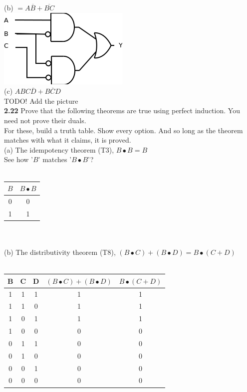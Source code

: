 \documentclass[12pt,a4paper]{report}
\newcommand*{\bl}{\overline{B}}
\newcommand*{\dl}{\overline{D}}
\begin{document}
\begin{normalsize}
(b) $ = A\bl{} + \overline{BC} $ \\
\includegraphics[scale=1]{2_16B} \\

(c) $ ABC\dl{} + \overline{BCD} $ \\
TODO! Add the picture \\

\textbf{2.22} Prove that the following theorems are true using perfect induction. You need not prove their duals.\\

For these, build a truth table. Show every option. And so long as the theorem matches with what it claims, it is proved. \\

(a) The idempotency theorem (T3), $ B \bullet B = B $ \\
See how '$ B $' matches '$ B \bullet B $'? \\ \\
\begin{tabular}{|c|c|}
$ B $ & $ B \bullet B $ \\ 
\hline 
0 & 0 \\ 
\hline 
1 & 1 \\ 
\hline 
\end{tabular} \\ \\

(b) The distributivity theorem (T8), $ (B \bullet C) + (B \bullet D) = B \bullet (C + D) $ \\ \\
\begin{tabular}{|c|c|c|c|c|}
B & C & D & $ (B \bullet C) + (B \bullet D) $ & $ B \bullet (C + D) $ \\ 
\hline 
1 & 1 & 1 & 1 & 1 \\ 
\hline 
1 & 1 & 0 & 1 & 1 \\ 
\hline 
1 & 0 & 1 & 1 & 1 \\ 
\hline 
1 & 0 & 0 & 0 & 0 \\ 
\hline 
0 & 1 & 1 & 0 & 0 \\ 
\hline 
0 & 1 & 0 & 0 & 0 \\ 
\hline 
0 & 0 & 1 & 0 & 0 \\ 
\hline 
0 & 0 & 0 & 0 & 0 \\ 
\hline 
\end{tabular} \\ \\


\end{normalsize}
\end{document}
